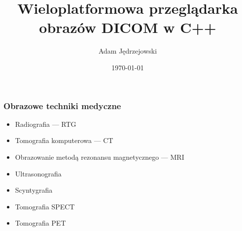 \documentclass[aspectratio=169]{beamer}
\title{Wieloplatformowa przeglądarka obrazów DICOM w C++}
\author{Adam Jędrzejowski}
\date{\today}
\begin{document}
\begin{frame}
    \titlepage
\end{frame}

\begin{frame}
    \frametitle{Obrazowe techniki medyczne}

    \begin{itemize}
        \item Radiografia --- RTG
        \item Tomografia komputerowa --- CT
        \item Obrazowanie metodą rezonansu magnetycznego --- MRI
        \item Ultrasonografia
        \item Scyntygrafia
        \item Tomografia SPECT
        \item Tomografia PET
    \end{itemize}
\end{frame}
\end{document}

